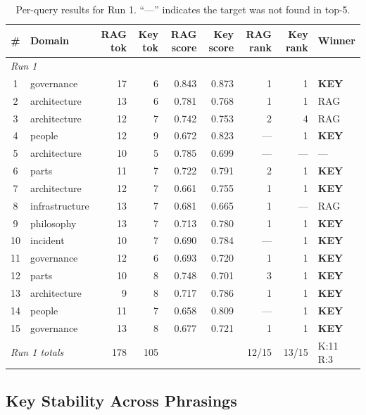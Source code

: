 \documentclass{article}
\begin{document}
\begin{table}[H]
\centering
\small
\begin{tabular}{clrrrrrrl}
\toprule
\textbf{\#} & \textbf{Domain} & \textbf{RAG tok} & \textbf{Key tok} & \textbf{RAG score} & \textbf{Key score} & \textbf{RAG rank} & \textbf{Key rank} & \textbf{Winner} \\
\midrule
\multicolumn{9}{l}{\textit{Run 1}} \\
\midrule
1 & governance & 17 & 6 & 0.843 & 0.873 & 1 & 1 & \textbf{KEY} \\
2 & architecture & 13 & 6 & 0.781 & 0.768 & 1 & 1 & RAG \\
3 & architecture & 12 & 7 & 0.742 & 0.753 & 2 & 4 & RAG \\
4 & people & 12 & 9 & 0.672 & 0.823 & --- & 1 & \textbf{KEY} \\
5 & architecture & 10 & 5 & 0.785 & 0.699 & --- & --- & --- \\
6 & parts & 11 & 7 & 0.722 & 0.791 & 2 & 1 & \textbf{KEY} \\
7 & architecture & 12 & 7 & 0.661 & 0.755 & 1 & 1 & \textbf{KEY} \\
8 & infrastructure & 13 & 7 & 0.681 & 0.665 & 1 & --- & RAG \\
9 & philosophy & 13 & 7 & 0.713 & 0.780 & 1 & 1 & \textbf{KEY} \\
10 & incident & 10 & 7 & 0.690 & 0.784 & --- & 1 & \textbf{KEY} \\
11 & governance & 12 & 6 & 0.693 & 0.720 & 1 & 1 & \textbf{KEY} \\
12 & parts & 10 & 8 & 0.748 & 0.701 & 3 & 1 & \textbf{KEY} \\
13 & architecture & 9 & 8 & 0.717 & 0.786 & 1 & 1 & \textbf{KEY} \\
14 & people & 11 & 7 & 0.658 & 0.809 & --- & 1 & \textbf{KEY} \\
15 & governance & 13 & 8 & 0.677 & 0.721 & 1 & 1 & \textbf{KEY} \\
\midrule
\multicolumn{2}{l}{\textit{Run 1 totals}} & 178 & 105 & & & 12/15 & 13/15 & K:11 R:3 \\
\bottomrule
\end{tabular}
\caption{Per-query results for Run 1. ``---'' indicates the target was not found in top-5.}
\label{tab:run1}
\end{table}

\subsection{Key Stability Across Phrasings}
\label{sec:stability}
\end{document}
